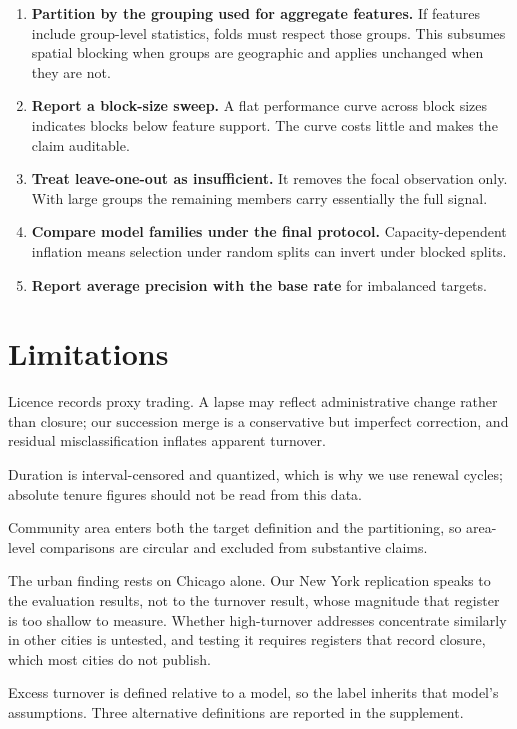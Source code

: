 \documentclass[11pt]{article}
\begin{document}
\begin{enumerate}
\item \textbf{Partition by the grouping used for aggregate features.} If features
include group-level statistics, folds must respect those groups. This subsumes
spatial blocking when groups are geographic and applies unchanged when they are
not.
\item \textbf{Report a block-size sweep.} A flat performance curve across block
sizes indicates blocks below feature support. The curve costs little and makes
the claim auditable.
\item \textbf{Treat leave-one-out as insufficient.} It removes the focal
observation only. With large groups the remaining members carry essentially the
full signal.
\item \textbf{Compare model families under the final protocol.} Capacity-dependent
inflation means selection under random splits can invert under blocked splits.
\item \textbf{Report average precision with the base rate} for imbalanced targets.
\end{enumerate}

\section{Limitations}

Licence records proxy trading. A lapse may reflect administrative change rather
than closure; our succession merge is a conservative but imperfect correction,
and residual misclassification inflates apparent turnover.

Duration is interval-censored and quantized, which is why we use renewal cycles;
absolute tenure figures should not be read from this data.

Community area enters both the target definition and the partitioning, so
area-level comparisons are circular and excluded from substantive claims.

The urban finding rests on Chicago alone. Our New York replication speaks to
the evaluation results, not to the turnover result, whose magnitude that register
is too shallow to measure. Whether high-turnover addresses concentrate similarly
in other cities is untested, and testing it requires registers that record
closure, which most cities do not publish.

Excess turnover is defined relative to a model, so the label inherits that
model's assumptions. Three alternative definitions are reported in the
supplement.
\end{document}

